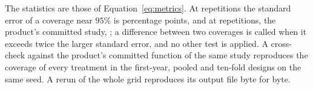 The statistics are those of Equation~\eqref{eq:metrics}. At  repetitions the standard error of a coverage near $95\%$ is  percentage points, and at  repetitions, the product's committed study, ; a difference between two coverages is called when it exceeds twice the larger standard error, and no other test is applied. A cross-check against the product's committed function of the same study reproduces the coverage of every treatment in the first-year, pooled and ten-fold designs on the same seed. A rerun of the whole grid reproduces its output file byte for byte.


